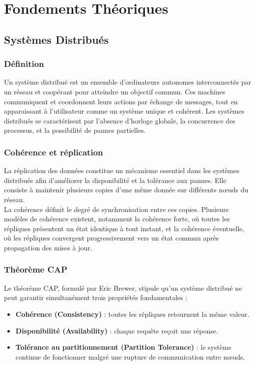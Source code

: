 \documentclass[a4paper,oneside,12pt]{book}
\begin{document}
\newpage
\part{Fondements Théoriques}
\setcounter{chapter}{0}

\chapter{Systèmes Distribués}\label{chap1}

\section{Définition}

Un système distribué est un ensemble d’ordinateurs autonomes interconnectés par un réseau et coopérant pour atteindre un objectif commun. Ces machines communiquent et coordonnent leurs actions par échange de messages, tout en apparaissant à l’utilisateur comme un système unique et cohérent.  
Les systèmes distribués se caractérisent par l’absence d’horloge globale, la concurrence des processus, et la possibilité de pannes partielles.\\

\section{Cohérence et réplication}

La réplication des données constitue un mécanisme essentiel dans les systèmes distribués afin d’améliorer la disponibilité et la tolérance aux pannes. Elle consiste à maintenir plusieurs copies d’une même donnée sur différents nœuds du réseau.\\

La cohérence définit le degré de synchronisation entre ces copies. Plusieurs modèles de cohérence existent, notamment la cohérence forte, où toutes les répliques présentent un état identique à tout instant, et la cohérence éventuelle, où les répliques convergent progressivement vers un état commun après propagation des mises à jour.

\section{Théorème CAP}

Le théorème CAP, formulé par Eric Brewer, stipule qu’un système distribué ne peut garantir simultanément trois propriétés fondamentales :  
\begin{itemize}
	\item[-] \textbf{Cohérence (Consistency)} : toutes les répliques retournent la même valeur.
	\item[-] \textbf{Disponibilité (Availability)} : chaque requête reçoit une réponse.
	\item[-] \textbf{Tolérance au partitionnement (Partition Tolerance)} : le système continue de fonctionner malgré une rupture de communication entre nœuds.
\end{itemize}
\end{document}
